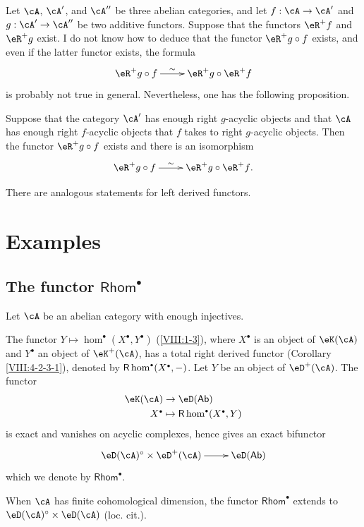 Let $\cA$, $\cA'$, and $\cA''$ be three abelian categories, and let
$f:\cA\to \cA'$ and $g:\cA'\to \cA''$ be two additive functors. Suppose
that the functors $\eR^+ f$ and $\eR^+ g$ exist. I do not know how to
deduce that the functor $\eR^+ g\circ f$ exists, and even if the latter
functor exists, the formula
\[\xymatrix{
  \eR^+ g\circ f\ar[r]^-\sim
    & \eR^+ g \circ \eR^+ f
}\]
is probably not true in general. Nevertheless, one has the following
proposition.

\begin{proposition}\label{VIII:4-3-1}
Suppose that the category $\cA'$ has enough right $g$-acyclic objects and
that $\cA$ has enough right $f$-acyclic objects that $f$ takes to right
$g$-acyclic objects. Then the functor $\eR^+ g\circ f$ exists and there
is an isomorphism
\[\xymatrix{
  \eR^+ g\circ f \ar[r]^-\sim
    & \eR^+ g \circ \eR^+ f \text{.}
}\]
\end{proposition}

There are analogous statements for left derived functors.

\section{Examples}\label{VIII:6} %

\subsection{The functor \texorpdfstring{$\mathsf{Rhom}^\bullet$}{Hom*}}\label{VIII:6-1}

Let $\cA$ be an abelian category with enough injectives.

The functor $Y\mapsto \hom^\bullet(X^\bullet,Y^\bullet)$
(\ref{VIII:1-3}), where $X^\bullet$ is an object of $\eK(\cA)$ and
$Y^\bullet$ an object of $\eK^+(\cA)$, has a total right derived functor
(Corollary \ref{VIII:4-2-3-1}), denoted by
$\rhom^\bullet(X^\bullet,-)$. Let $Y$ be an object of $\eD^+(\cA)$.
The functor
\begin{align*}
  \eK(\cA) &\to \eD(\mathsf{Ab}) \\
  X^\bullet &\mapsto \rhom^\bullet(X^\bullet,Y)
\end{align*}
is exact and vanishes on acyclic complexes, hence gives an exact
bifunctor
\[\xymatrix{
  \eD(\cA)^\circ \times \eD^+(\cA) \ar[r]
    & \eD(\mathsf{Ab})
}\]
which we denote by $\mathsf{Rhom}^\bullet$.

When $\cA$ has finite cohomological dimension, the functor
$\mathsf{Rhom}^\bullet$ extends to
$\eD(\cA)^\circ\times \eD(\cA)$ (loc. cit.).

